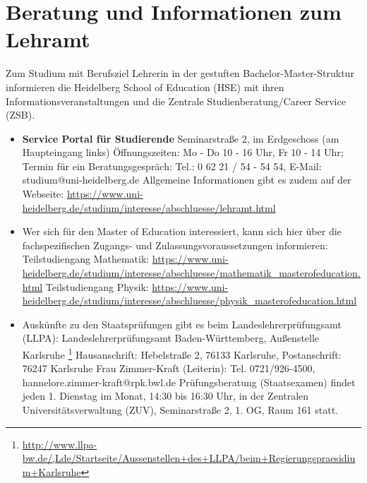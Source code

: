 \section{Beratung und Informationen zum Lehramt}

Zum Studium mit Berufsziel Lehrerin in der gestuften Bachelor-Master-Struktur informieren die Heidelberg School of Education (HSE) mit ihren Informationsveranstaltungen und die Zentrale Studienberatung/Career Service (ZSB).
\begin{itemize}
\item \textbf{Service Portal für Studierende} \newline
    Seminarstraße 2, im Erdgeschoss (am Haupteingang links)
    Öffnungszeiten: Mo - Do 10 - 16 Uhr, Fr 10 - 14 Uhr; \newline
    Termin für ein Beratungsgespräch: Tel.: 0 62 21 / 54 - 54 54, E-Mail: studium@uni-heidelberg.de \newline
    Allgemeine Informationen gibt es zudem auf der Webseite: \newline
    \url{https://www.uni-heidelberg.de/studium/interesse/abschluesse/lehramt.html}

\item Wer sich für den Master of Education interessiert, kann sich hier über die fachspezifischen Zugangs- und Zulassungsvoraussetzungen informieren:
    Teilstudiengang Mathematik: \newline
    \url{https://www.uni-heidelberg.de/studium/interesse/abschluesse/mathematik_masterofeducation.html} \newline
    Teilstudiengang Physik: \newline
    \url{https://www.uni-heidelberg.de/studium/interesse/abschluesse/physik_masterofeducation.html}

\item Auskünfte zu den Staatsprüfungen gibt es beim Landeslehrerprüfungsamt (LLPA): \newline
    Landeslehrerprüfungsamt Baden-Württemberg, Außenstelle Karlsruhe \footnote{\url{http://www.llpa-bw.de/,Lde/Startseite/Aussenstellen+des+LLPA/beim+Regierungspraesidium+Karlsruhe}} \newline
    Hausanschrift: Hebelstraße 2, 76133 Karlsruhe, Postanschrift: 76247 Karlsruhe \newline
    Frau Zimmer-Kraft (Leiterin): Tel. 0721/926-4500, hannelore.zimmer-kraft@rpk.bwl.de \newline
    Prüfungsberatung (Staatsexamen) findet jeden 1. Dienstag im Monat, 14:30 bis 16:30 Uhr, in der Zentralen Universitätsverwaltung (ZUV), Seminarstraße 2, 1. OG, Raum 161 statt.


\end{itemize}
